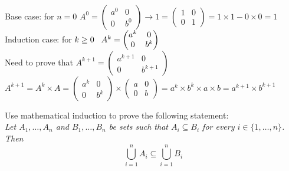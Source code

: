 \documentclass[addpoints,10pt,answers]{exam}
\begin{document}
\begin{questions}
\begin{solution}
\\Base case: for $n=0$  \hspace{1mm} $A^0 = 
\begin{pmatrix}
a^0 & 0 \\
0 & b^0
 \end{pmatrix}\rightarrow 1=
\begin{pmatrix}
1 & 0 \\
0 & 1
 \end{pmatrix}
 =1\times1-0\times0=1$\\
 Induction case: for $k\geq0 \hspace{3mm} A^k=\begin{pmatrix}
a^k & 0 \\
0 & b^k
 \end{pmatrix}$\\
 Need to prove that $A^{k+1} = 
 \begin{pmatrix}
a^{k+1} & 0 \\
0 & b^{k+1}
 \end{pmatrix}$\\
 $A^{k+1}=A^k \times A= 
 \begin{pmatrix}
a^k & 0 \\
0 & b^k
 \end{pmatrix} \times \begin{pmatrix}
a & 0 \\
0 & b
 \end{pmatrix}=a^k \times b^k \times a    \times b=a^{k+1} \times b^{k+1}$
  
 
\end{solution}


\question[12] Use mathematical induction to prove the following statement:\\

\emph{
Let $A_1, \ldots, A_n$ and $B_1, \ldots, B_n$ be sets such that $A_i \subseteq B_i$ for every $i \in \{1, \ldots, n\}$.
Then 
$$
\bigcup_{i = 1}^{n} A_i \subseteq \bigcup_{i = 1}^{n} B_i
$$
}
 


\end{questions}
\end{document}

